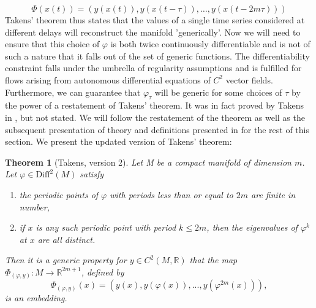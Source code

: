 \documentclass[11pt, a4paper]{memoir}
\theoremstyle{break}
\newtheorem{thm}{Theorem}
\theoremstyle{break}
\theoremstyle{nonumberplain}
\newcommand{\mR}{\mathbb{R}}
\begin{document}
$$\Phi(x(t))=(y(x(t)),y(x(t-\tau)),\ldots,y(x(t-2m\tau)))$$
Takens' theorem thus states that the values of a single time series considered at different delays will reconstruct the manifold 'generically'. Now we will need to ensure that this choice of $\varphi$ is both twice continuously differentiable and is not of such a nature that it falls out of the set of generic functions. The differentiability constraint falls under the umbrella of regularity assumptions and is fulfilled for flows arising from autonomous differential equations of $C^2$ vector fields. Furthermore, we can guarantee that $\varphi_\tau$ will be generic for some choices of $\tau$ by the power of a restatement of Takens' theorem. It was in fact proved by Takens in \cite{Takens}, but not stated. We will follow the restatement of the theorem as well as the subsequent presentation of theory and definitions presented in \cite{Huke} for the rest of this section. We present the updated version of Takens' theorem:
\begin{thm}[Takens, version 2]
Let M be a compact manifold of dimension $m$. Let $\varphi\in\text{Diff}^2(M)$ satisfy
\begin{enumerate}[label=\arabic*)]
	\item the periodic points of $\varphi$ with periods less than or equal to $2m$ are finite in number,
	\item if $x$ is any such periodic point with period $k\leqslant 2m$, then the eigenvalues of $\varphi^k$ at $x$ are all distinct.
\end{enumerate}
 Then it is a generic property for $y\in C^2(M,\mR)$ that the map $\Phi_{(\varphi,y)}:M\to \mathbb{R}^{2m+1}$, defined by
$$\Phi_{(\varphi,y)}(x)=(y(x),y(\varphi(x)),...,y(\varphi^{2m}(x))),$$
is an embedding. \cite{Huke}
\end{thm}
\end{document}
